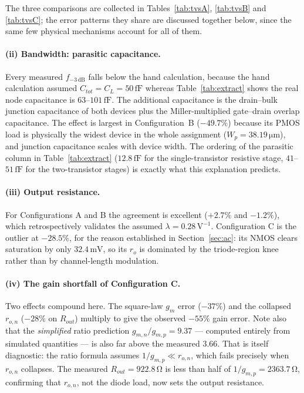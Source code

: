 \documentclass[12pt,a4paper]{article}
\newcommand{\U}[1]{\,\mathrm{#1}}
\begin{document}
The three comparisons are collected in Tables~\ref{tab:tvsA},
\ref{tab:tvsB} and \ref{tab:tvsC}; the error patterns they share are discussed
together below, since the same few physical mechanisms account for all of them.

\paragraph{(ii) Bandwidth: parasitic capacitance.}
Every measured $f_{-3\U{dB}}$ falls below the hand calculation, because the
hand calculation assumed $C_{tot}=C_L=50\U{fF}$ whereas
Table~\ref{tab:extract} shows the real node capacitance is $63$--$101\U{fF}$.
The additional capacitance is the drain--bulk junction capacitance of both
devices plus the Miller-multiplied gate--drain overlap capacitance. The effect
is largest in Configuration~B ($-49.7\%$) because its PMOS load is physically
the widest device in the whole assignment ($W_p = 38.19\U{\mu m}$), and
junction capacitance scales with device width. The ordering of the parasitic
column in Table~\ref{tab:extract} ($12.8\U{fF}$ for the single-transistor
resistive stage, $41$--$51\U{fF}$ for the two-transistor stages) is exactly
what this explanation predicts.

\paragraph{(iii) Output resistance.}
For Configurations A and B the agreement is excellent ($+2.7\%$ and $-1.2\%$),
which retrospectively validates the assumed $\lambda = 0.28\U{V^{-1}}$.
Configuration C is the outlier at $-28.5\%$, for the reason established in
Section~\ref{sec:ac}: its NMOS clears saturation by only $32.4\U{mV}$, so its
$r_o$ is dominated by the triode-region knee rather than by channel-length
modulation.

\paragraph{(iv) The gain shortfall of Configuration C.}
Two effects compound here. The square-law $g_m$ error ($-37\%$) and the
collapsed $r_{o,n}$ ($-28\%$ on $R_{out}$) multiply to give the observed
$-55\%$ gain error. Note also that the \emph{simplified} ratio prediction
$g_{m,n}/g_{m,p}=9.37$ --- computed entirely from simulated quantities --- is
also far above the measured $3.66$. That is itself diagnostic: the ratio
formula assumes $1/g_{m,p} \ll r_{o,n}$, which fails precisely when $r_{o,n}$
collapses. The measured $R_{out}=922.8\U{\Omega}$ is less than half of
$1/g_{m,p}=2363.7\U{\Omega}$, confirming that $r_{o,n}$, not the diode load,
now sets the output resistance.
\end{document}
